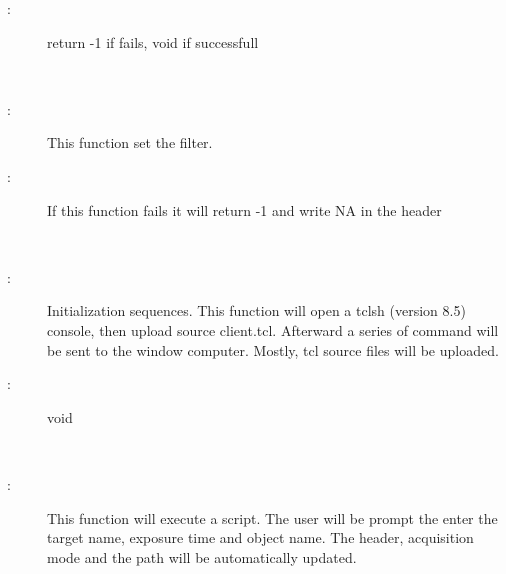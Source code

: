 \documentclass[letterpaper,10pt,english]{sphinxmanual}
\begin{document}
\begin{fulllineitems}
\begin{fulllineitems}
\begin{description}
\item[{:}] \leavevmode
return -1 if fails, void if successfull

\end{description}

\end{fulllineitems}


\begin{fulllineitems}
\label{\detokenize{index:python_andor.command.fw}}~\begin{description}
\item[{:}] \leavevmode
This function set the filter.

\item[{:}] \leavevmode
If this function fails it will return -1 and write NA in the header

\end{description}

\end{fulllineitems}


\begin{fulllineitems}
\label{\detokenize{index:python_andor.command.initialize}}~\begin{description}
\item[{:}] \leavevmode
Initialization sequences. This function will open a tclsh (version 8.5) console, then upload source client.tcl. Afterward a series of command will be sent to the window computer. Mostly, tcl source files will be uploaded.

\item[{:}] \leavevmode
void

\end{description}

\end{fulllineitems}


\begin{fulllineitems}
\label{\detokenize{index:python_andor.command.script}}~\begin{description}
\item[{:}] \leavevmode
This function will execute a script. The user will be prompt the enter the target name, exposure time and object name. The header, acquisition mode and the path will be automatically updated.


\end{description}
\end{fulllineitems}
\end{fulllineitems}
\end{document}
